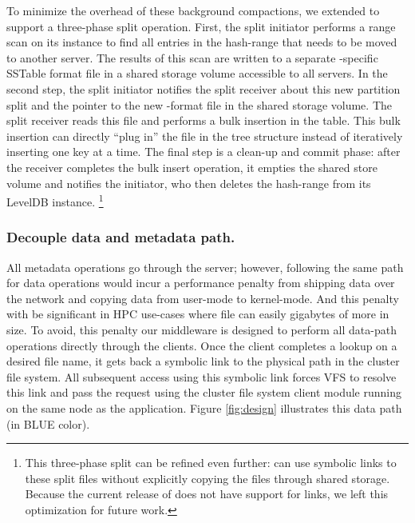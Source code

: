 To minimize the overhead of these background compactions, we extended \ldb{}
to support a three-phase split operation. 
First, the split initiator performs a range scan on its \ldb{} instance to find all
entries in the hash-range that needs to be moved to another server. The results
of this scan are written to a separate \ldb{}-specific SSTable format file in a 
shared storage volume accessible to all \giga{} servers.
In the second step, the split initiator notifies the split receiver about this new
partition split and the pointer to the new \ldb{}-format file in the shared
storage volume. The split receiver reads this file and performs a bulk
insertion in the \ldb{} table. This bulk insertion can
directly ``plug in'' the file in the \ldb{} tree structure instead of
iteratively inserting one key at a time.
The final step is a clean-up and commit phase: after the receiver completes the 
bulk insert operation, it empties the shared store volume and notifies the 
initiator, who then deletes the hash-range from its LevelDB instance.
\footnote
{
This three-phase split can be refined even further: \ldb{} can use symbolic links 
to these split files without explicitly copying the files through shared
storage. Because the current release of \ldb{} does not have support for links, we 
left this optimization for future work. 
}

\subsubsection*{Decouple data and metadata path.}
All metadata operations go through the \giga{} server; however, following the
same path for data operations would incur a performance penalty from shipping
data over the network and copying data from user-mode to kernel-mode. And this
penalty with be significant in HPC use-cases where file can easily gigabytes of
more in size. To avoid, this penalty our middleware is designed to perform all
data-path operations directly through the clients. Once the client completes a
lookup on a desired file name, it gets back a symbolic link to the physical
path in the cluster file system. All subsequent access using this symbolic
link forces VFS to resolve this link and pass the request using the cluster
file system client module running on the same node as the application. Figure
\ref{fig:design} illustrates this data path (in BLUE color).


